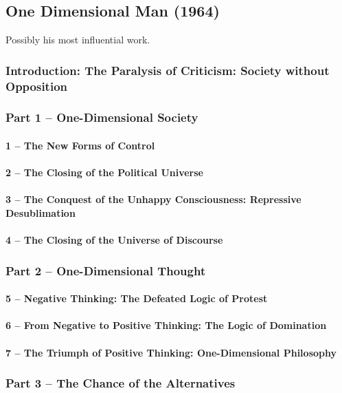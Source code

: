 \documentclass[10pt,titlepage]{book}
\begin{document}
\subsection{One Dimensional Man (1964) \cite{marcuse-one-dim}}

Possibly his most influential work.

\subsubsection{Introduction: The Paralysis of Criticism: Society without Opposition}
\subsubsection{Part 1 – One-Dimensional Society}
\paragraph{1 – The New Forms of Control}
\paragraph{2 – The Closing of the Political Universe}
\paragraph{3 – The Conquest of the Unhappy Consciousness: Repressive Desublimation}
\paragraph{4 – The Closing of the Universe of Discourse}
\subsubsection{Part 2 – One-Dimensional Thought}
\paragraph{5 – Negative Thinking: The Defeated Logic of Protest}
\paragraph{6 – From Negative to Positive Thinking: The Logic of Domination}
\paragraph{7 – The Triumph of Positive Thinking: One-Dimensional Philosophy}
\subsubsection{Part 3 – The Chance of the Alternatives}
\end{document}
